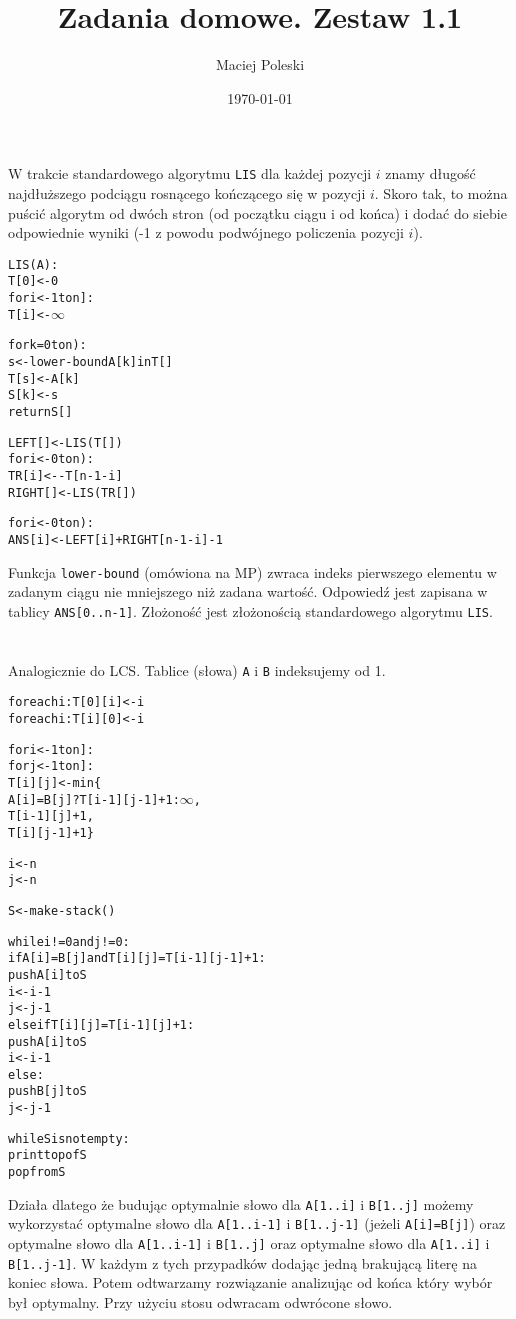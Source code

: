 \documentclass[a4paper,12pt]{article}
\title{Zadania domowe. Zestaw 1.1}
\author{Maciej Poleski}
\date{\today}
\begin{document}
\maketitle

\newpage

\section{}
W trakcie standardowego algorytmu \verb|LIS| dla każdej pozycji $i$ znamy długość najdłuższego podciągu rosnącego kończącego się w pozycji $i$. Skoro tak, to można puścić algorytm od dwóch stron (od początku ciągu i od końca) i dodać do siebie odpowiednie wyniki (-1 z powodu podwójnego policzenia pozycji $i$).
\begin{alltt}
LIS(A):
    T[0] <- 0
    for i <- 1 to n]:
        T[i] <- \(\infty\)

    for k=0 to n):
        s <- lower-bound A[k] in T[]
        T[s] <- A[k]
        S[k] <- s
    return S[]

LEFT[] <- LIS(T[])
for i <- 0 to n):
    TR[i] <- -T[n-1-i]
RIGHT[] <- LIS(TR[])

for i <- 0 to n):
    ANS[i] <- LEFT[i] + RIGHT[n-1-i] - 1

\end{alltt}
Funkcja \verb|lower-bound| (omówiona na MP) zwraca indeks pierwszego elementu w zadanym ciągu nie mniejszego niż zadana wartość. Odpowiedź jest zapisana w tablicy \verb|ANS[0..n-1]|. Złożoność jest złożonością standardowego algorytmu \verb|LIS|.

\section{}
Analogicznie do LCS. Tablice (słowa) \verb|A| i \verb|B| indeksujemy od 1.
\begin{alltt}
for each i: T[0][i] <- i
for each i: T[i][0] <- i

for i <- 1 to n]:
    for j <- 1 to n]:
        T[i][j] <- min\{
            A[i]=B[j] ? T[i-1][j-1]+1 : \(\infty\),
            T[i-1][j]+1,
            T[i][j-1]+1\}

i <- n
j <- n

S <- make-stack()

while i != 0 and j != 0:
    if A[i]=B[j] and T[i][j]=T[i-1][j-1]+1:
        push A[i] to S
        i <- i-1
        j <- j-1
    else if T[i][j]=T[i-1][j]+1:
        push A[i] to S
        i <- i-1
    else:
        push B[j] to S
        j <- j-1

while S is not empty:
    print top of S
    pop from S

\end{alltt}
Działa dlatego że budując optymalnie słowo dla \verb|A[1..i]| i \verb|B[1..j]| możemy wykorzystać optymalne słowo dla \verb|A[1..i-1]| i \verb|B[1..j-1]| (jeżeli \verb|A[i]=B[j]|) oraz optymalne słowo dla \verb|A[1..i-1]| i \verb|B[1..j]| oraz optymalne słowo dla \verb|A[1..i]| i \verb|B[1..j-1]|. W każdym z tych przypadków dodając jedną brakującą literę na koniec słowa. Potem odtwarzamy rozwiązanie analizując od końca który wybór był optymalny. Przy użyciu stosu odwracam odwrócone słowo.
\end{document}
